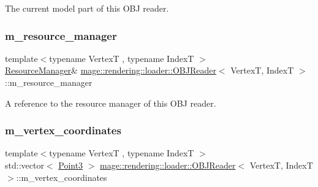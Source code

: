 The current model part of this O\+BJ reader. \mbox{\label{classmage_1_1rendering_1_1loader_1_1_o_b_j_reader_ae6208964e05f3e93eb9939942fe3b55c}} 
\subsubsection{\texorpdfstring{m\+\_\+resource\+\_\+manager}{m\_resource\_manager}}
{\footnotesize\ttfamily template$<$typename VertexT , typename IndexT $>$ \\
\mbox{\hyperlink{classmage_1_1rendering_1_1_resource_manager}{Resource\+Manager}}\& \mbox{\hyperlink{classmage_1_1rendering_1_1loader_1_1_o_b_j_reader}{mage\+::rendering\+::loader\+::\+O\+B\+J\+Reader}}$<$ VertexT, IndexT $>$\+::m\+\_\+resource\+\_\+manager\hspace{0.3cm}{\ttfamily [private]}}

A reference to the resource manager of this O\+BJ reader. \mbox{\label{classmage_1_1rendering_1_1loader_1_1_o_b_j_reader_a393e0932f169a786e38f120fc6f0d84b}} 
\subsubsection{\texorpdfstring{m\+\_\+vertex\+\_\+coordinates}{m\_vertex\_coordinates}}
{\footnotesize\ttfamily template$<$typename VertexT , typename IndexT $>$ \\
std\+::vector$<$ \mbox{\hyperlink{structmage_1_1_point3}{Point3}} $>$ \mbox{\hyperlink{classmage_1_1rendering_1_1loader_1_1_o_b_j_reader}{mage\+::rendering\+::loader\+::\+O\+B\+J\+Reader}}$<$ VertexT, IndexT $>$\+::m\+\_\+vertex\+\_\+coordinates\hspace{0.3cm}{\ttfamily [private]}}

